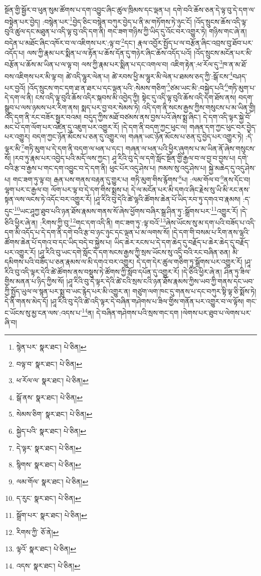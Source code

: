 སྔོན་གྱི་སྦྱོར་བ་ཕུན་སུམ་ཚོགས་པ་དག་འབྱུང་ཞིང་ཚུལ་ཁྲིམས་དང་ལྡན་པ། དགེ་བའི་ཆོས་ཅན་དེ་ལྟ་བུ་དེ་དག་ལ་བསྟེན་པར་བྱེད། :བསྙེན་པར་\footnote{སྙེན་པར་  སྣར་ཐང་།  པེ་ཅིན། }བྱེད་ཅིང་བསྙེན་བཀུར་བྱེད་པ་ནི་མ་གཏོགས་ཏེ་ཉུང་ངོ། །འོད་སྲུངས་ཆོས་འདི་ལྟ་བུའི་ཚུལ་དང་མཐུན་པ་འདི་ལྟ་བུ་འདི་དག་ནི། གང་ཟག་གཉིས་ཀྱི་ཡིད་དུ་འོང་བར་འགྱུར་ཏེ། གཉིས་གང་ཞེ་ན། བདེན་པ་མཐོང་ཞིང་འཁོར་བ་ལ་འཇིགས་པར་:ལྟ་བ་\footnote{བལྟ་བ་  སྣར་ཐང་།  པེ་ཅིན། }དང་། རྣལ་འབྱོར་སྤྱོད་པ་ལ་བརྩོན་ཞིང་འབྲས་བུ་ཐོབ་པར་འདོད་པ། ལས་ཀྱི་རྣམ་པར་སྨིན་པ་ལ་རྟོན་པ་ཆོས་དོན་དུ་གཉེར་ཞིང་ཆོས་འདོད་པའོ། །འོད་སྲུངས་མངོན་པར་མི་བརྩོན་པ་ཆོས་མ་ཡིན་པ་ལ་ལྟ་བ། ལས་ཀྱི་རྣམ་པར་སྨིན་པ་དང་འགལ་བ། འཇིག་རྟེན་:ཕ་རོལ་དུ་\footnote{ཕ་རོལ་ལ་  སྣར་ཐང་།  པེ་ཅིན། }ཁ་ན་མ་ཐོ་བས་འཇིགས་པར་མི་ལྟ་བ། ཚེ་འདི་ལྷུར་ལེན་པ། ཚེ་རབས་ཕྱི་མ་ལྷུར་མི་ལེན་པ་ཐམས་ཅད་ཀྱི་:སྒོ་ངས་\footnote{སྒོ་ནས་  སྣར་ཐང་།  པེ་ཅིན། }བཤད་པར་བྱའོ། །འོད་སྲུངས་གང་དག་ཐ་ན་ཐར་པ་དང་ལྡན་པའི་:སེམས་གཅིག་\footnote{སེམས་ཅིག་  སྣར་ཐང་།  པེ་ཅིན། }ཙམ་ཡང་མི་:བསྐྱེད་པའི་\footnote{སྐྱེད་པའི་  སྣར་ཐང་།  པེ་ཅིན། }གཏི་མུག་པ་དེ་དག་ལ་ནི། ངས་འདི་ལྟ་བུའི་ཆོས་འདིར་སྐབས་མི་འབྱེད་ཀྱི། སྟེང་དུ་འདི་ལྟ་བུའི་ཆོས་འདི་དག་ཐོས་ནས། བདག་སྒྲུབ་པ་ལས་ཉམས་པར་རིག་ནས། སྨད་པར་བྱ་བར་སེམས་ཏེ། འདི་དག་ནི་སངས་རྒྱས་ཀྱིས་གསུངས་པ་མ་ཡིན་གྱི། འདི་དག་ནི་རང་བཟོར་སྦྱར་བའམ། བདུད་ཀྱིས་མཐོ་བཙམས་ནས་བྱས་པའོ་ཞེས་སྨྲ་ཞིང་། དེ་དག་འདི་ལྟར་སྐྱེ་བོ་མང་པོ་དག་ལོག་པར་འཛིན་དུ་འཇུག་པར་འགྱུར་རོ། །དེ་དག་ནི་བདག་ཀྱང་ཕུང་ལ། གཞན་དག་ཀྱང་ཕུང་བར་བྱེད་པར་འགྱུར། བདག་ཀྱང་ཉོན་མོངས་པ་ཅན་དུ་འགྱུར་ལ། གཞན་ཡང་ཉོན་མོངས་པ་ཅན་དུ་བྱེད་པར་འགྱུར་ཏེ། :དེ་ལྟར་མི་\footnote{དེ་ལྟར་  སྣར་ཐང་།  པེ་ཅིན། }གཏི་མུག་པ་དེ་དག་ནི་བདག་ལ་ཕན་པ་དང་། གཞན་ལ་ཕན་པའི་ཕྱིར་ཞུགས་པ་མ་ཡིན་ནོ་ཞེས་གསུངས་སོ། །རབ་ཏུ་རྣམ་པར་འབྱེད་པའི་མདོ་ལས་ཀྱང་། ཤཱ་རིའི་བུ་དེ་ལ་དགེ་སློང་སྔོན་གྱི་རྒྱལ་བ་ལ་བྱ་བ་བྱས་པ། དགེ་བའི་རྩ་བ་རྒྱས་པ་གང་དག་འབྱུང་བ་དེ་དག་ནི། ཕུང་པོར་འདུ་ཤེས་པ། ཁམས་སུ་འདུ་ཤེས་པ། སྐྱེ་མཆེད་དུ་འདུ་ཤེས་པ། གང་ཟག་ཏུ་ལྟ་བ། རྒན་པས་གནས་བརྟན་དུ་གྱུར་པ། གཏི་མུག་གིས་རྙོགས་\footnote{སྙིགས་  སྣར་ཐང་།  པེ་ཅིན། }པ། :ལམ་གོལ་བ་\footnote{ལམ་གོལ་  སྣར་ཐང་།  པེ་ཅིན། }ནས་དོང་བ། ལྷག་པར་ང་རྒྱལ་བ། ལོག་པར་ལྟ་བ་དེ་དག་གིས་སྨྲས་པ། དེ་ལ་མངོན་པར་མི་དགའ་ཞིང་རྗེས་སུ་ཡི་མི་རང་ནས་སྟན་ལས་ལངས་ཏེ་འདོང་བར་འགྱུར་རོ། །ཤཱ་རིའི་བུ་དེའི་ཚེ་ལྷའི་ཚོགས་ཆེན་པོ་ཡིད་རབ་ཏུ་དགའ་བ་རྣམས། :ད་དུང་\footnote{ད་རུང་  སྣར་ཐང་།  པེ་ཅིན། }ཡང་ཤཱཀྱ་ཐུབ་པའི་ཉན་ཐོས་རྣམས་གནས་སོ་ཞེས་ཕྱོགས་བཞིར་སྒྲ་ཤིན་ཏུ་:སྒྲོགས་པར་\footnote{སྒྲོག་པར་  སྣར་ཐང་།  པེ་ཅིན། }འགྱུར་རོ། །དེ་ཅིའི་ཕྱིར་ཞེ་ན། :རིགས་ཀྱི་བུ་\footnote{རིགས་ཀྱི་  ཅོ་ནེ། }གང་དག་འདི་ནི། གང་ཟག་ཏུ་:ལྟ་བའོ་\footnote{ལྟའོ་  སྣར་ཐང་།  པེ་ཅིན། }ཞེས་ཡོངས་སུ་མ་དག་པའི་བཟོད་པ་འདི་དག་མི་འདོད་པ་དེ་དག་ནི་དགེ་བའི་རྩ་བ་ཉང་ཉུང་དང་ལྡན་པ་མ་ལགས་སོ། །དེ་དག་གི་བསམ་པ་རིག་ནས་ལྷའི་ཚོགས་ཆེན་པོ་དགའ་བ་དང་ཡིད་བདེ་བ་སྐྱེས་པ། ཡིད་ཆེར་རངས་པ་དེ་དག་ཆེད་དུ་བརྗོད་པ་ཆེར་ཆེད་དུ་བརྗོད་པར་འགྱུར་རོ། །ཤཱ་རིའི་བུ་ཡང་དགེ་སློང་དེ་དག་སངས་རྒྱས་ཀྱི་སྲས་ཡོངས་སུ་འདྲི་བའི་རང་བཞིན་ཅན། མི་དམིགས་པའི་བཟོད་པ་ཅན་རྣམས་ལ་མི་དགའ་བར་འགྱུར། དེ་དག་དེར་ཚུལ་གཅིག་ཏུ་སྒྲོགས་པར་འགྱུར་རོ། །ཤཱ་རིའི་བུ་འདི་ལྟར་དེའི་ཚེ་ཚོགས་ནས་བསྡུས་ཏེ་ཚོགས་ཀྱི་སློབ་དཔོན་དུ་འགྱུར་རོ། །དེ་ཅིའི་ཕྱིར་ཞེ་ན། ཤིན་ཏུ་ཟིལ་གྱིས་མནན་པ་ཉིད་ཀྱིས་སོ། །ཤཱ་རིའི་བུ་དེ་ལྟར་དེའི་ཚེ་ངའི་སྲས་ངའི་ཉན་ཐོས་རྣམས་ཀྱིས་ཡབ་ཀྱི་གནས་དང་ཡབ་ཀྱི་སྤྱོད་ཡུལ་ལ་སྙན་པར་སྨྲ་བ་ཡང་རྙེད་པར་མི་འགྱུར་ན། གཙུག་ལག་ཁང་དུ་གནས་པ་དང་བཀུར་སྟི་ལྟ་ཅི་སྨོས་ཏེ། དེ་ནི་གནས་མེད་དོ། །ཤཱ་རིའི་བུ་དེའི་ཚེ་འདི་ལྟར་དེ་བཞིན་གཤེགས་པ་ཟིལ་གྱིས་གནོན་པར་འགྱུར་བ་ལ་ལྟོས། གང་ང་ཡོངས་སུ་མྱ་ངན་ལས་:འདས་པ་\footnote{འདས་  སྣར་ཐང་།  པེ་ཅིན། }ན། དེ་བཞིན་གཤེགས་པའི་སྲས་གང་དག །ལེགས་པར་ཐུབ་པ་ལེགས་པར་ཞི་བ། 